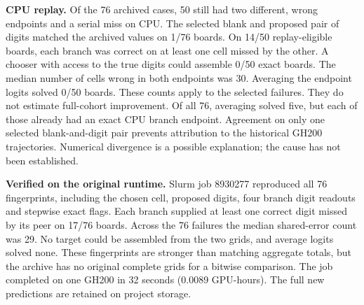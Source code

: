 \textbf{CPU replay.} Of the 76 archived cases, 50 still had two different, wrong endpoints and a serial miss on CPU. The selected blank and proposed pair of digits matched the archived values on 1/76 boards. On 14/50 replay-eligible boards, each branch was correct on at least one cell missed by the other. A chooser with access to the true digits could assemble 0/50 exact boards. The median number of cells wrong in both endpoints was 30. Averaging the endpoint logits solved 0/50 boards. These counts apply to the selected failures. They do not estimate full-cohort improvement.
Of all 76, averaging solved five, but each of those already had an exact CPU branch endpoint. Agreement on only one selected blank-and-digit pair prevents attribution to the historical GH200 trajectories. Numerical divergence is a possible explanation; the cause has not been established.
\par
\textbf{Verified on the original runtime.} Slurm job 8930277 reproduced all 76 fingerprints, including the chosen cell, proposed digits, four branch digit readouts and stepwise exact flags. Each branch supplied at least one correct digit missed by its peer on 17/76 boards. Across the 76 failures the median shared-error count was 29. No target could be assembled from the two grids, and average logits solved none. These fingerprints are stronger than matching aggregate totals, but the archive has no original complete grids for a bitwise comparison. The job completed on one GH200 in 32 seconds (0.0089 GPU-hours). The full new predictions are retained on project storage.
